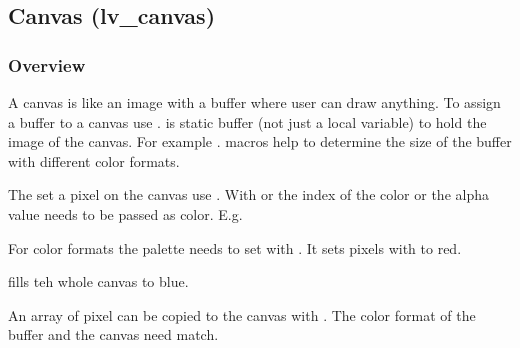 \documentclass[letterpaper,10pt,english]{sphinxmanual}
\begin{document}
\subsection{Canvas (lv\_canvas)}
\label{\detokenize{object-types/canvas:canvas-lv-canvas}}\label{\detokenize{object-types/canvas::doc}}

\subsubsection{Overview}
\label{\detokenize{object-types/canvas:overview}}
A canvas is like an image with a buffer where user can draw anything.
To assign a buffer to a canvas use .  is static buffer (not just a local variable) to hold the image of the canvas. For example
.  macros help to determine the size of the buffer with different color formats.

The set a pixel on the canvas use . With  or  the index of the color or the alpha value needs to be passed as color. E.g. 

For  color formats the palette needs to set with  . It sets pixels with  to red.

 fills teh whole canvas to blue.

An array of pixel can be copied to the canvas with . The color format of the buffer and the canvas need match.
\end{document}
